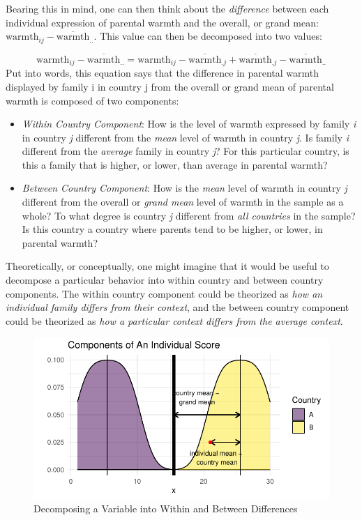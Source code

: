 \documentclass[
  letterpaper,
  DIV=11,
  numbers=noendperiod]{scrreprt}
\providecommand{\tightlist}{%
  \setlength{\itemsep}{0pt}\setlength{\parskip}{0pt}}\usepackage{longtable,booktabs,array}
\begin{document}
Bearing this in mind, one can then think about the \emph{difference}
between each individual expression of parental warmth and the overall,
or grand mean: \(\text{warmth}_{ij} - \overline{\text{warmth}}_{..}\).
This value can then be decomposed into two values:

\[\text{warmth}_{ij} - \overline{\text{warmth}}_{..} = \text{warmth}_{ij} - \overline{\text{warmth}}_{.j} + \overline{\text{warmth}}_{.j} - \overline{\text{warmth}}_{..}\]
Put into words, this equation says that the difference in parental
warmth displayed by family i in country j from the overall or grand mean
of parental warmth is composed of two components:

\begin{itemize}
\tightlist
\item
  \emph{Within Country Component}: How is the level of warmth expressed
  by family \emph{i} in country \emph{j} different from the \emph{mean}
  level of warmth in country \emph{j}. Is family \emph{i} different from
  the \emph{average} family in country \emph{j}? For this particular
  country, is this a family that is higher, or lower, than average in
  parental warmth?
\item
  \emph{Between Country Component}: How is the \emph{mean} level of
  warmth in country \emph{j} different from the overall or \emph{grand
  mean} level of warmth in the sample as a whole? To what degree is
  country \emph{j} different from \emph{all countries} in the sample? Is
  this country a country where parents tend to be higher, or lower, in
  parental warmth?
\end{itemize}

Theoretically, or conceptually, one might imagine that it would be
useful to decompose a particular behavior into within country and
between country components. The within country component could be
theorized as \emph{how an individual family differs from their context},
and the between country component could be theorized as \emph{how a
particular context differs from the average context}.

\begin{figure}

{\centering \includegraphics{cross-sectional_files/figure-pdf/fig-withinbetween-1.pdf}

}

\caption{\label{fig-withinbetween}Decomposing a Variable into Within and
Between Differences}

\end{figure}
\end{document}
